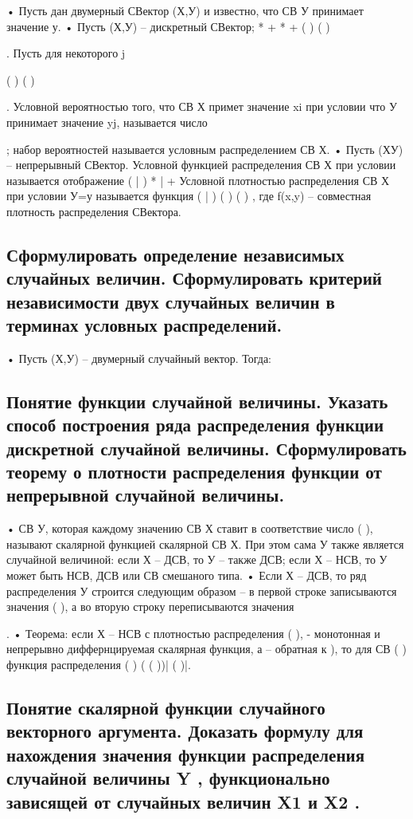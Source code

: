 • Пусть дан двумерный СВектор (Х,У) и известно, что СВ У принимает значение у.
• Пусть (Х,У) – дискретный СВектор; *
+ *
+ {( ) (
	)} {
	
}. Пусть для некоторого j

{
	
}
{( ) (
	)}
{
}



. Условной вероятностью того, что СВ Х примет значение xi при условии что У принимает
значение yj, называется число


; набор вероятностей называется условным распределением СВ Х.
• Пусть (ХУ) – непрерывный СВектор. Условной функцией распределения СВ Х при условии называется отображение
( | )
* | + Условной плотностью распределения СВ Х при условии У=у называется функция
( | )
( )
( )
, где f(x,y) – совместная
плотность распределения СВектора.

\subsection{Сформулировать определение независимых случайных величин. Сформулировать критерий независимости двух случайных величин в терминах условных распределений.}

• Пусть (Х,У) – двумерный случайный вектор. Тогда:


\subsection{Понятие функции случайной величины. Указать способ построения ряда распределения функции дискретной случайной величины. Сформулировать теорему о плотности распределения функции от непрерывной случайной величины.}

• СВ У, которая каждому значению СВ Х ставит в соответствие число ( ), называют скалярной функцией скалярной СВ Х. При этом
сама У также является случайной величиной: если Х – ДСВ, то У – также ДСВ; если Х – НСВ, то У может быть НСВ, ДСВ или СВ смешаного
типа.
• Если Х – ДСВ, то ряд распределения У строится следующим образом – в первой строке записываются значения (
), а во вторую
строку переписываются значения

.
• Теорема: если Х – НСВ с плотностью распределения
( ), - монотонная и непрерывно диффернцируемая скалярная функция, а
– обратная к ), то для СВ ( ) функция распределения
( ) ( ( ))|
( )|.

\subsection{Понятие скалярной функции случайного векторного аргумента. Доказать формулу для нахождения значения функции распределения случайной величины Y , функционально зависящей от случайных величин X1 и X2 .}

